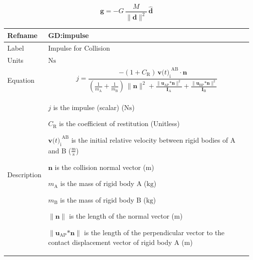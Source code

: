 \documentclass[12pt]{article}
\begin{document}
\begin{displaymath}
\symbf{g}=-G\,\frac{M}{{\|\symbf{d}\|^{2}}}\,\symbf{\hat{d}}
\end{displaymath}
\medskip
\noindent
\begin{minipage}{\textwidth}
\begin{tabular}{>{\raggedright}p{}>{\raggedright\arraybackslash}p{}}
\toprule \textbf{Refname} & \textbf{GD:impulse}
\label{GD:impulse}
\\ \midrule
Label & Impulse for Collision
        
\\ \midrule
Units & $\text{N}\text{s}$
        
\\ \midrule
Equation & \begin{displaymath}
           j=\frac{-\left(1+{C_{\text{R}}}\right)\,{{\symbf{v}\text{(}t\text{)}_{\text{i}}}^{\text{A}\text{B}}}\cdot{}\symbf{n}}{\left(\frac{1}{{m_{\text{A}}}}+\frac{1}{{m_{\text{B}}}}\right)\,\|\symbf{n}\|^{2}+\frac{\|{\symbf{u}_{\text{A}\text{P}}}\text{*}\symbf{n}\|^{2}}{{\symbf{I}_{\text{A}}}}+\frac{\|{\symbf{u}_{\text{B}\text{P}}}\text{*}\symbf{n}\|^{2}}{{\symbf{I}_{\text{B}}}}}
           \end{displaymath}
\\ \midrule
Description & \begin{symbDescription}
              \item{$j$ is the impulse (scalar) ($\text{N}\text{s}$)}
              \item{${C_{\text{R}}}$ is the coefficient of restitution (Unitless)}
              \item{${{\symbf{v}\text{(}t\text{)}_{\text{i}}}^{\text{A}\text{B}}}$ is the initial relative velocity between rigid bodies of A and B ($\frac{\text{m}}{\text{s}}$)}
              \item{$\symbf{n}$ is the collision normal vector (${\text{m}}$)}
              \item{${m_{\text{A}}}$ is the mass of rigid body A (${\text{kg}}$)}
              \item{${m_{\text{B}}}$ is the mass of rigid body B (${\text{kg}}$)}
              \item{$\|\symbf{n}\|$ is the length of the normal vector (${\text{m}}$)}
              \item{$\|{\symbf{u}_{\text{A}\text{P}}}\text{*}\symbf{n}\|$ is the length of the perpendicular vector to the contact displacement vector of rigid body A (${\text{m}}$)}

\end{symbDescription}
\end{tabular}
\end{minipage}
\end{document}
